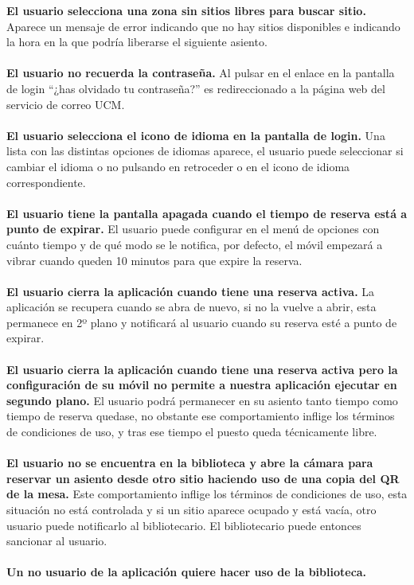 \documentclass[12pt]{article}
\begin{document}
\textbf{El usuario selecciona una zona sin sitios libres para buscar sitio.}
Aparece un mensaje de error indicando que no hay sitios disponibles e indicando la hora en la que podría liberarse el siguiente asiento.
\\
\\
\textbf{El usuario no recuerda la contraseña.}
Al pulsar en el enlace en la pantalla de login “¿has olvidado tu contraseña?” es redireccionado a la página web del servicio de correo UCM.
\\
\\
\textbf{El usuario selecciona el icono de idioma en la pantalla de login.}
Una lista con las distintas opciones de idiomas aparece, el usuario puede seleccionar si cambiar el idioma o no pulsando en retroceder o en el icono de idioma correspondiente.
\\
\\
\textbf{El usuario tiene la pantalla apagada cuando el tiempo de reserva está a punto de expirar.}
El usuario puede configurar en el menú de opciones con cuánto tiempo y de qué modo se le notifica, por defecto, el móvil empezará a vibrar cuando queden 10 minutos para que expire la reserva.
\\
\\
\textbf{El usuario cierra la aplicación cuando tiene una reserva activa.}
La aplicación se recupera cuando se abra de nuevo, si no la vuelve a abrir, esta permanece en 2º plano y notificará al usuario cuando su reserva esté a punto de expirar.
\\
\\
\textbf{El usuario cierra la aplicación cuando tiene una reserva activa pero la configuración de su móvil no permite a nuestra aplicación ejecutar en segundo plano.}
El usuario podrá permanecer en su asiento tanto tiempo como tiempo de reserva quedase, no obstante ese comportamiento inflige los términos de condiciones de uso, y tras ese tiempo el puesto queda técnicamente libre.
\\
\\
\textbf{El usuario no se encuentra en la biblioteca y abre la cámara para reservar un asiento desde otro sitio haciendo uso de una copia del QR de la mesa.}
Este comportamiento inflige los términos de condiciones de uso, esta situación no está controlada y si un sitio aparece ocupado y está vacía, otro usuario puede notificarlo al bibliotecario. El bibliotecario puede entonces sancionar al usuario.
\\
\\
\textbf{Un no usuario de la aplicación quiere hacer uso de la biblioteca.}
\end{document}
